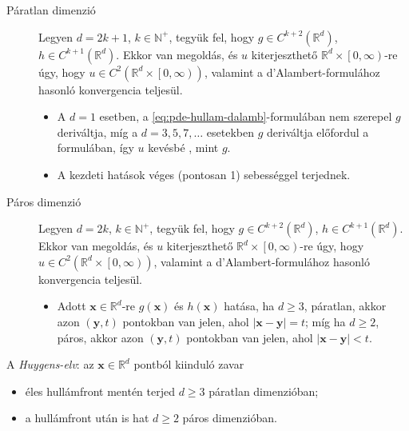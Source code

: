 \documentclass[DIV=15,appendixprefix]{scrreprt}
\theoremstyle{definition}
\theoremstyle{remark}
\begin{document}
\begin{description}
	\item[Páratlan dimenzió] Legyen $ d = 2 k + 1 $, $ k \in \mathbb{ N }^{ +} $, tegyük fel, hogy
		$ g \in C^{ k + 2 } \left( \mathbb{ R }^{ d } \right) $, $ h \in C^{ k + 1 } \left(
		\mathbb{ R }^{ d } \right) $. Ekkor van megoldás, és $ u $ kiterjeszthető
		$ \mathbb{ R }^{ d } \times \left.\left[ 0,{} \infty \right)\right. $-re úgy, hogy $ u \in
		C^{ 2 } \left( \mathbb{ R }^{ d } \times \left.\left[ 0,{} \infty \right) \right.\right) $,
		valamint a d'Alambert-formulához hasonló konvergencia teljesül.
		\begin{itemize}
			\item A $ d = 1 $ esetben, a \ref{eq:pde-hullam-dalamb}-formulában nem szerepel $ g $
			deriváltja, míg a $ d = 3,{} 5,{} 7,{} \ldots $ esetekben $ g $ deriváltja előfordul a
			formulában, így $ u $ kevésbé , mint $ g $.
			\item A kezdeti hatások véges (pontosan 1) sebességgel terjednek.
		\end{itemize}
	\item[Páros dimenzió] Legyen $ d = 2 k $, $ k \in \mathbb{ N }^{ +} $, tegyük fel, hogy
		$ g \in C^{ k + 2 } \left( \mathbb{ R }^{ d } \right) $, $ h \in C^{ k + 1 } \left(
		\mathbb{ R }^{ d } \right) $. Ekkor van megoldás, és $ u $ kiterjeszthető
		$ \mathbb{ R }^{ d } \times \left.\left[ 0,{} \infty \right)\right. $-re úgy, hogy $ u \in
		C^{ 2 } \left( \mathbb{ R }^{ d } \times \left.\left[ 0,{} \infty \right) \right.\right) $,
		valamint a d'Alambert-formulához hasonló konvergencia teljesül.
		\begin{itemize}
			\item Adott $ \mathbf{ x } \in \mathbb{ R }^{ d } $-re $ g \left( \mathbf{ x } \right) $
			és $ h \left( \mathbf{ x } \right) $ hatása, ha $ d \ge 3 $, páratlan, akkor azon
			$ \left( \mathbf{y},{} t \right) $ pontokban van jelen, ahol $ \left| \mathbf{ x } -
			\mathbf{ y } \right| = t $; míg ha $ d \ge 2 $, páros, akkor azon $ \left(
			\mathbf{ y },{} t \right) $ pontokban van jelen, ahol $ \left| \mathbf{ x } -
			\mathbf{ y } \right| < t $.
		\end{itemize}
\end{description}
A \emph{Huygens-elv}: az $ \mathbf{ x } \in \mathbb{ R }^{ d } $ pontból kiinduló zavar
\begin{itemize}
	\item éles hullámfront mentén terjed $ d \ge 3 $ páratlan dimenzióban;
	\item a hullámfront után is hat $ d \ge 2 $ páros dimenzióban.
\end{itemize}
\end{document}
